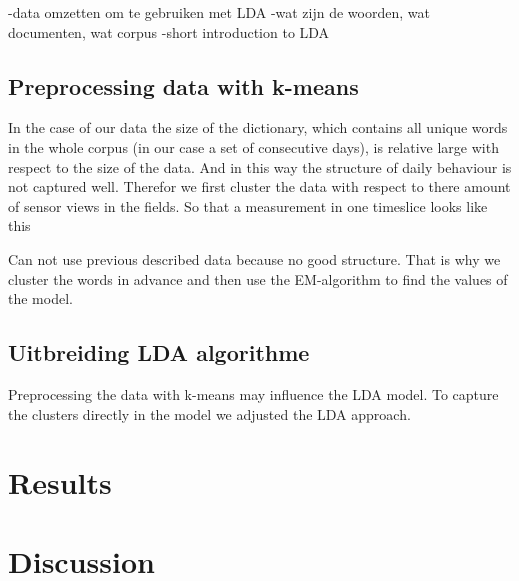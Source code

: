 \documentclass[11pt,a4paper]{report}
\begin{document}
-data omzetten om te gebruiken met LDA
-wat zijn de woorden, wat documenten, wat corpus
-short introduction to LDA

\subsection{Preprocessing data with k-means}
In the case of our data the size of the dictionary, which contains all unique words in the whole corpus (in our case a set of consecutive days), is relative large with respect to the size of the data. And in this way the structure of daily behaviour is not captured well.
Therefor we first cluster the data with respect to there amount of sensor views in the fields. So that a measurement in one timeslice looks like this


Can not use previous described data because no good structure. That is why we cluster the words in advance and then use the EM-algorithm to find the values of the model.



\subsection{Uitbreiding LDA algorithme}
Preprocessing the data with k-means may influence the LDA model. To capture the clusters directly in the model we adjusted the LDA approach. 


\section{Results}


\section{Discussion}
\end{document}
